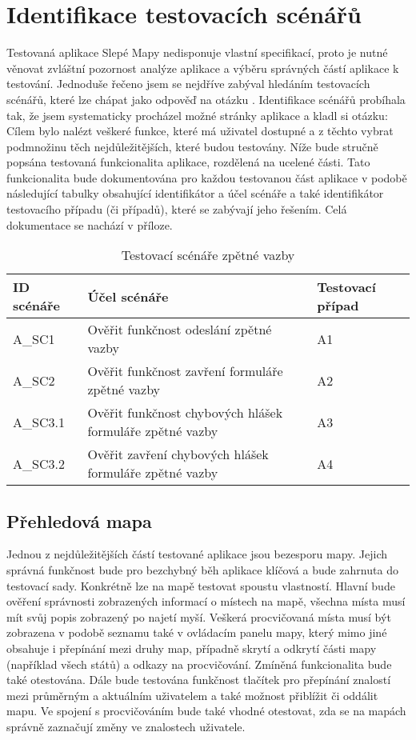 \documentclass[
    color,   %
	table,   %
    twoside, %
    nolot, nolof
]{fithesis3}
\begin{document}
\section{Identifikace testovacích scénářů}
Testovaná aplikace Slepé Mapy nedisponuje vlastní specifikací, proto je nutné věnovat zvláštní pozornost analýze aplikace a výběru správných částí aplikace k testování. Jednoduše řečeno jsem se nejdříve zabýval hledáním testovacích scénářů, které lze chápat jako odpověď na otázku . Identifikace scénářů probíhala tak, že jsem systematicky procházel možné stránky aplikace a kladl si otázku:  Cílem bylo nalézt veškeré funkce, které má uživatel dostupné a z těchto vybrat podmnožinu těch nejdůležitějších, které budou testovány. Níže bude stručně popsána testovaná funkcionalita aplikace, rozdělená na ucelené části. Tato funkcionalita bude dokumentována pro každou testovanou část aplikace v podobě následující tabulky obsahující identifikátor a účel scénáře a také identifikátor testovacího případu (či případů), které se zabývají jeho řešením. Celá dokumentace se nachází v příloze.

\begin{table}[h]
\begin{tabular}{ | L{2cm} | L{7cm} | L{2cm}}
\hline
	ID scénáře & Účel scénáře & Testovací případ \\ \hline
	A\_SC1 & Ověřit funkčnost odeslání zpětné vazby & A1 \\ \hline
	A\_SC2 & Ověřit funkčnost zavření formuláře zpětné vazby & A2 \\ \hline
	A\_SC3.1 & Ověřit funkčnost chybových hlášek formuláře zpětné vazby & A3 \\ \hline
	A\_SC3.2 & Ověřit zavření chybových hlášek formuláře zpětné vazby & A4 \\ \hline
\end{tabular}
\caption{Testovací scénáře zpětné vazby}
\end{table}

\subsection{Přehledová mapa}
Jednou z nejdůležitějších částí testované aplikace jsou bezesporu mapy. Jejich správná funkčnost bude pro bezchybný běh aplikace klíčová a bude zahrnuta do testovací sady. Konkrétně lze na mapě testovat spoustu vlastností. Hlavní bude ověření správnosti zobrazených informací o místech na mapě, všechna místa musí mít svůj popis zobrazený po najetí myší. Veškerá procvičovaná místa musí být zobrazena v podobě seznamu také v ovládacím panelu mapy, který mimo jiné obsahuje i přepínání mezi druhy map, případně skrytí a odkrytí části mapy (například všech států) a odkazy na procvičování. Zmíněná funkcionalita bude také otestována. Dále bude testována funkčnost tlačítek pro přepínání znalostí mezi průměrným a aktuálním uživatelem a také možnost přiblížit či oddálit mapu. Ve spojení s procvičováním bude také vhodné otestovat, zda se na mapách správně zaznačují změny ve znalostech uživatele.
\end{document}
